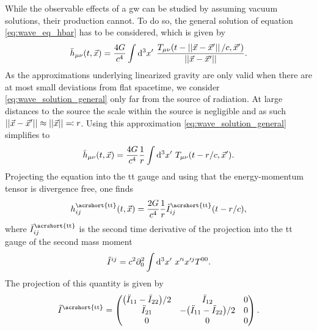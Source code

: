 While the observable effects of a \acrshort{gw} can be studied by assuming vacuum solutions, their production cannot. To do so, the general solution of equation \eqref{eq:wave_eq_hbar} has to be considered, which is given by
\begin{equation}\label{eq:wave_solution_general}
\bar{h}_\mn\lr{t,\vec{x}}=\frac{4G}{c^4}\int \Diff{3}x'\ \frac{T_\mn\lr{t-\left|\left|\vec{x}-\vec{x}'\right|\right| /c,\vec{x}'}}{\left|\left|\vec{x}-\vec{x}'\right|\right|}.
\end{equation}
As the approximations underlying linearized gravity are only valid when there are at most small deviations from flat spacetime, we consider \eqref{eq:wave_solution_general} only far from the source of radiation. At large distances to the source the scale within the source is negligible and as such ${\left|\left| \vec{x}-\vec{x}' \right|\right|}\approx{\left|\left| \vec{x} \right|\right|}\eqqcolon r$. Using this approximation \eqref{eq:wave_solution_general} simplifies to
\begin{equation}
\bar{h}_{\mu\nu}{\left( t,\vec{x} \right)}=\frac{4G}{c^4}\frac{1}{r}\int \mathop{}\!\mathrm{d^3}x'\ T_{\mu\nu}{\left( t-r/c, \vec{x}' \right)}.
\end{equation}
Projecting the equation into the \acrshort{tt} gauge and using that the energy-momentum tensor is divergence free, one finds~\cite{Maggiore:2008aaa}%
\begin{equation}\label{eq:quadrupole-formula}
h^{\text{\acrshort{tt}}}_{ij}\lr{t, \vec{x}} = \frac{2G}{c^4}\frac{1}{r}\ddot{I}^{\text{\acrshort{tt}}}_{ij}\lr{t-r/c},
\end{equation}
where $\ddot{I}^{\text{\acrshort{tt}}}_{ij}$ is the second time derivative of the projection into the \acrshort{tt} gauge of the second mass moment
\begin{equation}
\ddot{I}^{ij} = c^2 \partial^2_0\int\Diff{3}x'\ x'^ix'^j T^{00}.
\end{equation}
The projection of this quantity is given by~\cite{Maggiore:2008aaa}%
\begin{equation}\label{eq:I-tt-projection}
\ddot{I}^{\text{\acrshort{tt}}}=
\begin{pmatrix}
\lr{\ddot{I}_{11}-\ddot{I}_{22}}/2 & \ddot{I}_{12} & 0\\
\ddot{I}_{21} & -\lr{\ddot{I}_{11}-\ddot{I}_{22}}/2 & 0\\
0 & 0 & 0
\end{pmatrix}.
\end{equation}

